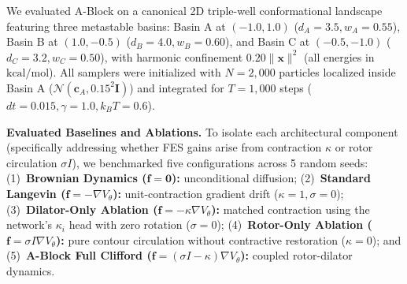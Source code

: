 \documentclass{article}
\begin{document}
We evaluated A-Block on a canonical 2D triple-well conformational landscape featuring three metastable basins: Basin A at $(-1.0, 1.0)$ ($d_A=3.5, w_A=0.55$), Basin B at $(1.0, -0.5)$ ($d_B=4.0, w_B=0.60$), and Basin C at $(-0.5, -1.0)$ ($d_C=3.2, w_C=0.50$), with harmonic confinement $0.20\|\mathbf{x}\|^2$ (all energies in $\text{kcal/mol}$). All samplers were initialized with $N = 2{,}000$ particles localized inside Basin A ($\mathcal{N}(\mathbf{c}_A, 0.15^2 \mathbf{I})$) and integrated for $T = 1{,}000$ steps ($dt = 0.015, \gamma = 1.0, k_B T = 0.6$).

\textbf{Evaluated Baselines and Ablations.} To isolate each architectural component (specifically addressing whether FES gains arise from contraction $\kappa$ or rotor circulation $\sigma I$), we benchmarked five configurations across 5 random seeds: (1)~\textbf{Brownian Dynamics ($\mathbf{f}=\mathbf{0}$):} unconditional diffusion; (2)~\textbf{Standard Langevin ($\mathbf{f}=-\nabla V_\theta$):} unit-contraction gradient drift ($\kappa=1, \sigma=0$); (3)~\textbf{Dilator-Only Ablation ($\mathbf{f}=-\kappa\nabla V_\theta$):} matched contraction using the network's $\kappa_i$ head with zero rotation ($\sigma=0$); (4)~\textbf{Rotor-Only Ablation ($\mathbf{f}=\sigma I\nabla V_\theta$):} pure contour circulation without contractive restoration ($\kappa=0$); and (5)~\textbf{A-Block Full Clifford ($\mathbf{f}=(\sigma I - \kappa)\nabla V_\theta$):} coupled rotor-dilator dynamics.
\end{document}

